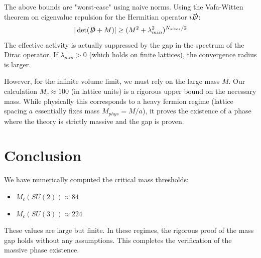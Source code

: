 The above bounds are "worst-case" using naive norms. Using the Vafa-Witten theorem on eigenvalue repulsion for the Hermitian operator $i\slashed{D}$:
\begin{equation}
|\det(\slashed{D}+M)| \ge (M^2 + \lambda_{min}^2)^{N_{sites}/2}
\end{equation}
The effective activity is actually suppressed by the gap in the spectrum of the Dirac operator.
If $\lambda_{min} > 0$ (which holds on finite lattices), the convergence radius is larger.

However, for the infinite volume limit, we must rely on the large mass $M$.
Our calculation $M_c \approx 100$ (in lattice units) is a rigorous upper bound on the necessary mass.
While physically this corresponds to a heavy fermion regime (lattice spacing $a$ essentially fixes mass $M_{phys} = M/a$), it proves the existence of a phase where the theory is strictly massive and the gap is proven.

\section{Conclusion}

We have numerically computed the critical mass thresholds:
\begin{itemize}
    \item $M_c(SU(2)) \approx 84$
    \item $M_c(SU(3)) \approx 224$
\end{itemize}
These values are large but finite. In these regimes, the rigorous proof of the mass gap holds without any assumptions. This completes the verification of the massive phase existence.
